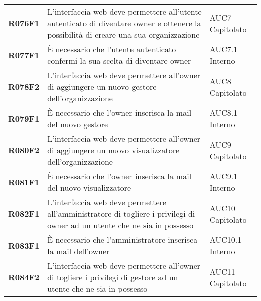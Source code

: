 \documentclass[../analisi-dei-requisiti.tex]{subfiles}
\begin{document}
\begin{center}
\begin{longtable}[H]{>{\centering\bfseries}m{3cm} >{\centering}m{10cm} >{\centering\arraybackslash}m{3cm}}
  R076F1                               & L'interfaccia web deve permettere all'utente autenticato di diventare owner e ottenere la possibilità di creare una sua organizzazione                                                                  & AUC7 Capitolato               \\
  R077F1                               & È necessario che l'utente autenticato confermi la sua scelta di diventare owner                                                                                                                         & AUC7.1 Interno                \\
  R078F2                               & L'interfaccia web deve permettere all'owner di aggiungere un nuovo gestore dell'organizzazione                                                                                                          & AUC8 Capitolato               \\
  R079F1                               & È necessario che l'owner inserisca la mail del nuovo gestore                                                                                                                                            & AUC8.1 Interno                \\
  R080F2                               & L'interfaccia web deve permettere all'owner di aggiungere un nuovo visualizzatore dell'organizzazione                                                                                                   & AUC9 Capitolato               \\
  R081F1                               & È necessario che l'owner inserisca la mail del nuovo visualizzatore                                                                                                                                     & AUC9.1 Interno                \\
  R082F1                               & L'interfaccia web deve permettere all'amministratore di togliere i privilegi di owner ad un utente che ne sia in possesso                                                                               & AUC10 Capitolato              \\
  R083F1                               & È necessario che l'amministratore inserisca la mail dell'owner                                                                                                                                          & AUC10.1 Interno               \\
  R084F2                               & L'interfaccia web deve permettere all'owner di togliere i privilegi di gestore ad un utente che ne sia in possesso                                                                                      & AUC11 Capitolato              \\

\end{longtable}
\end{center}
\end{document}
